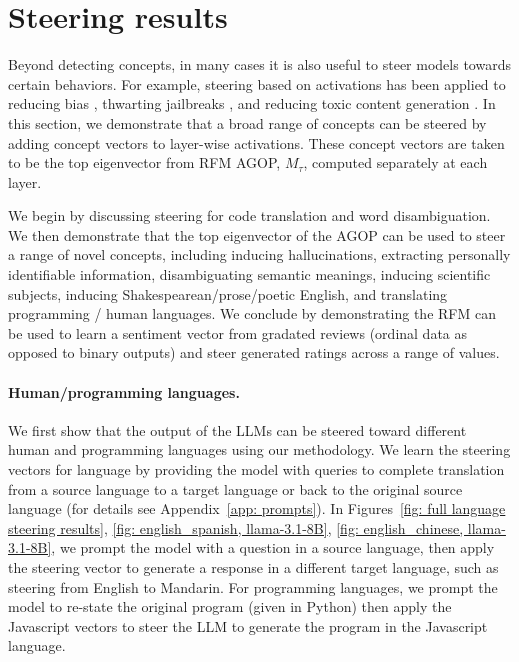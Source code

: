 \section{Steering results}

Beyond detecting concepts, in many cases it is also useful to steer models towards certain behaviors. For example, steering based on activations has been applied to reducing bias \citep{representation_engineering}, thwarting jailbreaks \citep{circuit_breakers}, and reducing toxic content generation \citep{turner2023activation}.  In this section, we demonstrate that a  broad range of concepts can be steered by adding concept vectors to layer-wise activations. These concept vectors are taken to be the top eigenvector from RFM AGOP, $M_{\tau}$, computed separately at each layer. 

We begin by discussing steering for code translation and word disambiguation. We then demonstrate that the top eigenvector of the AGOP can be used to steer a range of novel concepts, including inducing hallucinations, extracting personally identifiable information, disambiguating semantic meanings, inducing scientific subjects, inducing Shakespearean/prose/poetic English, and translating programming / human languages. We conclude by demonstrating the RFM can be used to learn a sentiment vector from gradated reviews (ordinal data as opposed to binary outputs) and steer generated ratings across a range of values.

\paragraph{Human/programming languages.} We first show that the output of the LLMs can be steered toward different human and programming languages using our methodology. We learn the steering vectors for language by providing the model with queries to complete translation from a source language to a target language or back to the original source language (for details see Appendix~\ref{app: prompts}). In Figures~\ref{fig: full language steering results}, \ref{fig: english_spanish, llama-3.1-8B}, \ref{fig: english_chinese, llama-3.1-8B}, we prompt the model with a question in a source language, then apply the steering vector to generate a response in a different target language, such as steering from English to Mandarin. For programming languages, we prompt the model to re-state the original program (given in Python) then apply the Javascript vectors to steer the LLM to generate the program in the Javascript language.

